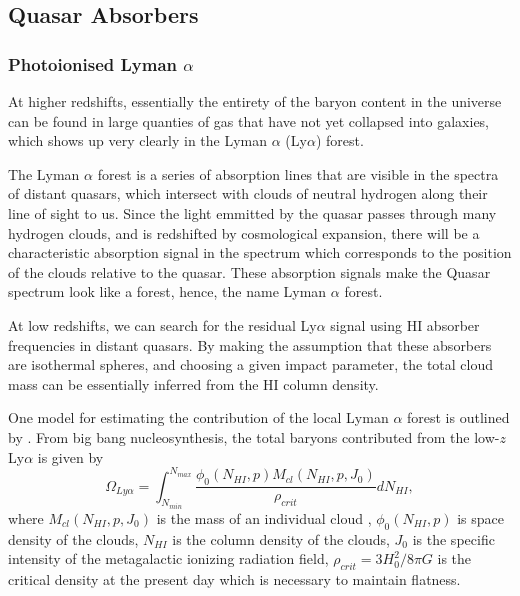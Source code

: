 \subsection{Quasar Absorbers}
\subsubsection{Photoionised Lyman $\alpha$}
At higher redshifts, essentially the entirety of the baryon content in the universe can be found in large quanties of gas that have not yet collapsed into galaxies, which shows up very clearly in the Lyman $\alpha$ (Ly$\alpha$) forest. 
\par The Lyman $\alpha$ forest is a series of absorption lines that are visible in the spectra of distant quasars, which intersect with clouds of neutral hydrogen along their line of sight to us. Since the light emmitted by the quasar passes through many hydrogen clouds, and is redshifted by cosmological expansion, there will be a characteristic absorption signal in the spectrum which corresponds to the position of the clouds relative to the quasar. These absorption signals make the Quasar spectrum look like a forest, hence, the name Lyman $\alpha$ forest. 

\par At low redshifts, we can search for the residual Ly$\alpha$ signal using HI absorber frequencies in distant quasars. By making the assumption that these absorbers are isothermal spheres, and choosing a given impact parameter, the total cloud mass can be essentially inferred from the HI column density. 

\par One model for estimating the contribution of the local Lyman $\alpha$ forest is outlined by \cite{2000ApJ...544..150P}. From big bang nucleosynthesis, the total baryons contributed from the low-$z$ Ly$\alpha$ is given by 
$$\Omega_{Ly\alpha} = \int_{N_{min}}^{N_{max}} \frac{ \phi_0(N_{HI},p) M_{cl}(N_{HI}, p, J_0)}{\rho_{crit}} dN_{HI} ,$$
where $M_{cl}(N_{HI}, p, J_0)$ is the mass of an individual cloud , $\phi_0(N_{HI},p)$ is space density of the clouds, $N_{HI}$ is the column density of the clouds, $J_0$ is the specific intensity of the metagalactic ionizing radiation field, $\rho_{crit} = 3 H_0^2/8 \pi G $ is the critical density at the present day which is necessary to maintain flatness.

